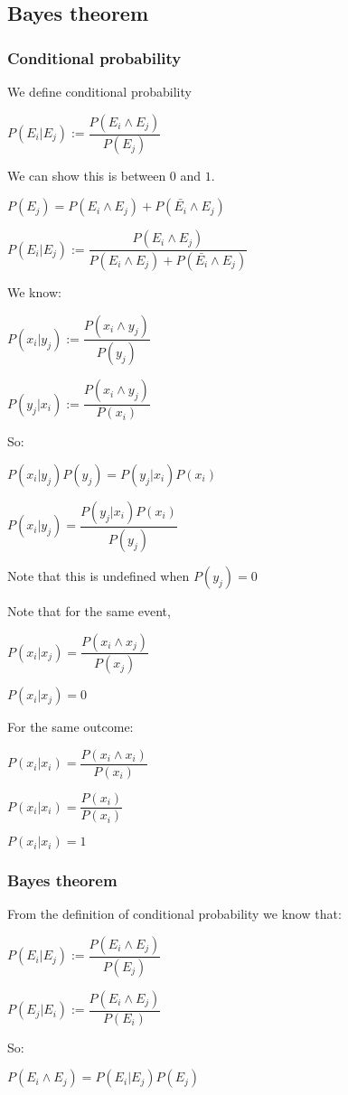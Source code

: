 
\subsection{Bayes theorem}

\subsubsection{Conditional probability}

We define conditional probability

\(P(E_i|E_j):=\dfrac{P(E_i\land E_j)}{P(E_j)}\)

We can show this is between \(0\) and \(1\).

\(P(E_j)=P(E_i\land E_j)+P(\bar{E_i}\land E_j)\)

\(P(E_i|E_j):=\dfrac{P(E_i\land E_j)}{ P(E_i\land E_j)+P(\bar{E_i}\land E_j)}\)

We know:

\(P(x_i|y_j):=\dfrac{P(x_i \land y_j)}{P(y_j)}\)

\(P(y_j|x_i):=\dfrac{P(x_i \land y_j)}{P(x_i)}\)

So:

\(P(x_i|y_j)P(y_j)=P(y_j|x_i) P(x_i)\)

\(P(x_i|y_j)=\dfrac{P(y_j|x_i) P(x_i)}{P(y_j)}\)

Note that this is undefined when \(P(y_j)=0\)

Note that for the same event, 

\(P(x_i|x_j)=\dfrac{P(x_i\land x_j)}{P(x_j)}\)

\(P(x_i|x_j)=0\)

For the same outcome:

\(P(x_i|x_i)=\dfrac{P(x_i\land x_i)}{P(x_i)}\)

\(P(x_i|x_i)=\dfrac{P(x_i)}{P(x_i)}\)

\(P(x_i|x_i)=1\)

\subsubsection{Bayes theorem}

From the definition of conditional probability we know that:

\(P(E_i|E_j):=\dfrac{P(E_i\land E_j)}{P(E_j)}\)

\(P(E_j|E_i):=\dfrac{P(E_i\land E_j)}{P(E_i)}\)

So:

\(P(E_i\land E_j)=P(E_i|E_j)P(E_j)\)

